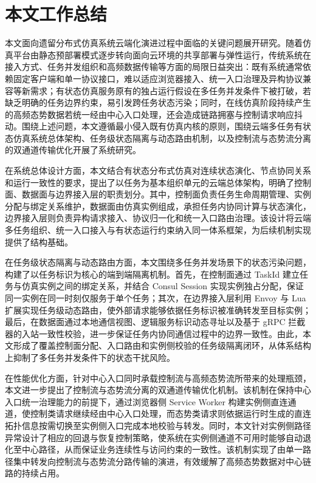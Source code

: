 \documentclass[lang=chs, degree=master, blindreview=true, winfonts=true, academic=false]{yanputhesis}
\begin{document}
\section{本文工作总结}

本文面向遗留分布式仿真系统云端化演进过程中面临的关键问题展开研究。随着仿真平台由静态预部署模式逐步转向面向云环境的共享部署与弹性运行，传统系统在接入方式、任务并发组织和高频数据传输等方面的局限日益突出：既有系统通常依赖固定客户端和单一协议接口，难以适应浏览器接入、统一入口治理及异构协议兼容等新需求；有状态仿真服务原有的独占运行假设在多任务并发条件下被打破，若缺乏明确的任务边界约束，易引发跨任务状态污染；同时，在线仿真阶段持续产生的高频态势数据若统一经由中心入口处理，还会造成链路拥塞与控制请求响应抖动。围绕上述问题，本文遵循最小侵入既有仿真内核的原则，围绕云端多任务有状态仿真系统总体架构、任务级状态隔离与动态路由机制，以及控制流与态势流分离的双通道传输优化开展了系统研究。

在系统总体设计方面，本文结合有状态分布式仿真对连续状态演化、节点协同关系和运行一致性的要求，提出了以任务为基本组织单元的云端总体架构，明确了控制面、数据面与边界接入层的职责划分。其中，控制面负责任务生命周期管理、实例分配与绑定关系维护，数据面由仿真实例组成，承担任务内协同计算与状态演化，边界接入层则负责异构请求接入、协议归一化和统一入口路由治理。该设计将云端多任务组织、统一入口接入与有状态运行约束纳入同一体系框架，为后续机制实现提供了结构基础。

在任务级状态隔离与动态路由方面，本文围绕多任务并发场景下的状态污染问题，构建了以任务标识为核心的端到端隔离机制。首先，在控制面通过 TaskId 建立任务与仿真实例之间的绑定关系，并结合 Consul Session 实现实例独占分配，保证同一实例在同一时刻仅服务于单个任务；其次，在边界接入层利用 Envoy 与 Lua 扩展实现任务级动态路由，使外部请求能够依据任务标识被准确转发至目标实例；最后，在数据面通过本地通信视图、逻辑服务标识动态寻址以及基于 gRPC 拦截器的入站一致性校验，进一步保证任务内协同通信过程中的边界一致性。由此，本文形成了覆盖控制面分配、入口路由和实例侧校验的任务级隔离闭环，从体系结构上抑制了多任务并发条件下的状态干扰风险。

在性能优化方面，针对中心入口同时承载控制流与高频态势流所带来的处理瓶颈，本文进一步提出了控制流与态势流分离的双通道传输优化机制。该机制在保持中心入口统一治理能力的前提下，通过浏览器侧 Service Worker 构建实例侧直连通道，使控制类请求继续经由中心入口处理，而态势类请求则依据运行时生成的直连拓扑信息按需切换至实例侧入口完成本地校验与转发。同时，本文针对实例侧路径异常设计了相应的回退与恢复控制策略，使系统在实例侧通道不可用时能够自动退化至中心路径，从而保证业务连续性与访问约束的一致性。该机制实现了由单一路径集中转发向控制流与态势流分路传输的演进，有效缓解了高频态势数据对中心链路的持续占用。
\end{document}
